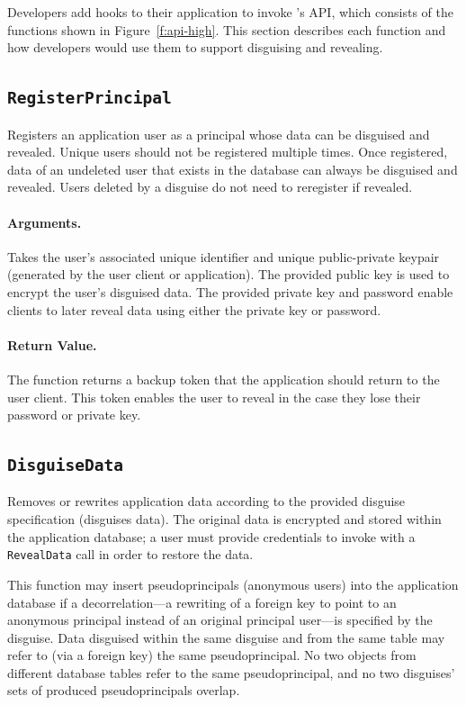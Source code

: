 Developers add hooks to their application to invoke \sys's API, which consists
of the functions shown in Figure~\ref{f:api-high}. This section describes each
function and how developers would use them to support disguising and revealing.
    

\subsection{\texttt{RegisterPrincipal}}

    Registers an application user as a principal whose data can be disguised and
    revealed. Unique users should not be registered multiple times.  Once
    registered, data of an undeleted user that exists in the database can always
    be disguised and revealed.
    Users deleted by a disguise do not need to reregister if revealed.

    \paragraph{Arguments.} Takes the user's associated unique identifier and unique
    public-private keypair (generated by the user
    client or application).
    The provided public key is used to encrypt the user's disguised data. The
    provided private key and password enable clients to later reveal data using
    either the private key or password.

    \paragraph{Return Value.} 
    The function returns a backup token that the application should return to
    the user client. This token enables the user to reveal in the case they lose
    their password or private key.


\subsection{\texttt{DisguiseData}}

    Removes or rewrites application data according to the provided disguise
    specification (\ie disguises data). The original data is encrypted and
    stored within the application database; a user must provide credentials to
    invoke with a \texttt{RevealData} call in order to restore the data.
    
    This function may insert pseudoprincipals (anonymous users) into the
    application database if a decorrelation---a rewriting of a foreign key to
    point to an anonymous principal instead of an original principal user---is
    specified by the disguise.  Data disguised within the same disguise and from
    the same table may refer to (via a foreign key) the same pseudoprincipal.
    No two objects from different database tables refer to the same
    pseudoprincipal, and no two disguises' sets of produced pseudoprincipals overlap.

